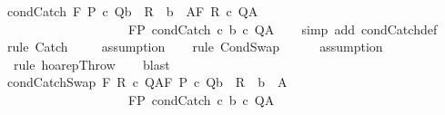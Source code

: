 \begin{isabellebody}
\isanewline
{}\isamarkupfalse%
\ condCatch{\isacharcolon}\ {\isachardoublequoteopen}{\isasymlbrakk}{\isasymGamma}{\isacharcomma}{\isasymTheta}{\isasymturnstile}\isactrlbsub {\isacharslash}F\isactrlesub \ P\ c\ Q{\isacharcomma}{\isacharparenleft}{\isacharparenleft}b\ {\isasyminter}\ R{\isacharparenright}\ {\isasymunion}\ {\isacharparenleft}{\isacharminus}b\ {\isasyminter}\ A{\isacharparenright}{\isacharparenright}{\isacharsemicolon}{\isasymGamma}{\isacharcomma}{\isasymTheta}{\isasymturnstile}\isactrlbsub {\isacharslash}F\isactrlesub \ R\ c\ Q{\isacharcomma}A{\isasymrbrakk}\ \isanewline
\ \ \ \ \ \ \ \ \ \ \ \ \ \ \ \ \ \ {\isasymLongrightarrow}\ \ {\isasymGamma}{\isacharcomma}{\isasymTheta}{\isasymturnstile}\isactrlbsub {\isacharslash}F\isactrlesub P\ condCatch\ c\ b\ c\ Q{\isacharcomma}A{\isachardoublequoteclose}\isanewline
%
\isadelimproof
\ \ %
\endisadelimproof
%
\isatagproof
{}\isamarkupfalse%
\ {\isacharparenleft}simp\ add{\isacharcolon}\ condCatch{\isacharunderscore}def{\isacharparenright}\isanewline
\ \ \isamarkupfalse%
\ {\isacharparenleft}rule\ Catch{\isacharparenright}\isanewline
\ \ \isamarkupfalse%
\ \ assumption\isanewline
\ \ \isamarkupfalse%
\ {\isacharparenleft}rule\ CondSwap{\isacharparenright}\isanewline
\ \ \isamarkupfalse%
\ \ \ {\isacharparenleft}assumption{\isacharparenright}\isanewline
\ \ \isamarkupfalse%
\ \ {\isacharparenleft}rule\ hoarep{\isachardot}Throw{\isacharparenright}\isanewline
\ \ \isamarkupfalse%
\ blast\isanewline
\ \ \isamarkupfalse%
%
\endisatagproof
{\isafoldproof}%
%
\isadelimproof
\isanewline
%
\endisadelimproof
\isanewline
{}\isamarkupfalse%
\ condCatchSwap{\isacharcolon}\ {\isachardoublequoteopen}{\isasymlbrakk}{\isasymGamma}{\isacharcomma}{\isasymTheta}{\isasymturnstile}\isactrlbsub {\isacharslash}F\isactrlesub \ R\ c\ Q{\isacharcomma}A{\isacharsemicolon}{\isasymGamma}{\isacharcomma}{\isasymTheta}{\isasymturnstile}\isactrlbsub {\isacharslash}F\isactrlesub \ P\ c\ Q{\isacharcomma}{\isacharparenleft}{\isacharparenleft}b\ {\isasyminter}\ R{\isacharparenright}\ {\isasymunion}\ {\isacharparenleft}{\isacharminus}b\ {\isasyminter}\ A{\isacharparenright}{\isacharparenright}{\isasymrbrakk}\ \isanewline
\ \ \ \ \ \ \ \ \ \ \ \ \ \ \ \ \ \ {\isasymLongrightarrow}\ \ {\isasymGamma}{\isacharcomma}{\isasymTheta}{\isasymturnstile}\isactrlbsub {\isacharslash}F\isactrlesub P\ condCatch\ c\ b\ c\ Q{\isacharcomma}A{\isachardoublequoteclose}\isanewline

\end{isabellebody}
